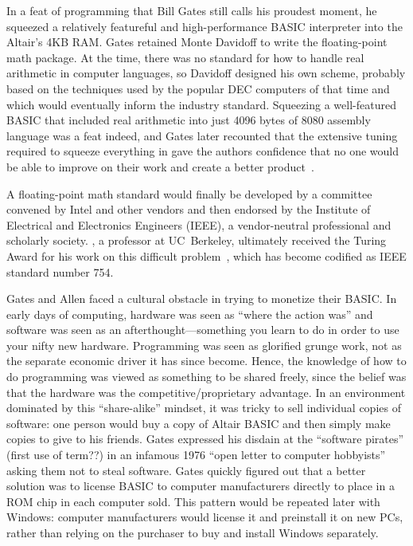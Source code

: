 In a feat of programming that Bill Gates
still calls his proudest moment, he squeezed a relatively featureful
and high-performance BASIC interpreter into the Altair's 4KB RAM.  
Gates retained
Monte Davidoff to write the floating-point math package.
At the time, there was no standard for how to handle real arithmetic in
computer languages, so Davidoff designed his own scheme, probably based
on the techniques used by the popular DEC computers of that time and
which would eventually inform the industry standard.
Squeezing a well-featured BASIC that included real arithmetic into just
4096 bytes of 8080 assembly language was a feat indeed, and Gates later
recounted that the extensive tuning required to squeeze everything in
gave the authors confidence that no one would be able to improve on their
work and create a better product~\cite{programmers_at_work}. 

  \begin{geeknote}
  A floating-point math standard would finally be developed by a
  committee convened by Intel 
  and other vendors and then endorsed by the Institute of Electrical and
  Electronics Engineers (IEEE), a vendor-neutral professional and scholarly
  society.  , a professor at UC~Berkeley, ultimately
  received the 
  Turing Award for his work on this difficult
  problem~\cite{kahan_interview}, which has become codified as IEEE
  standard number 754.
  \end{geeknote}

Gates and Allen faced a cultural obstacle in trying to monetize their
BASIC.  
In early days of computing, hardware was seen as ``where the action
was'' and software was seen as an afterthought---something you learn to
do in order to use your nifty new hardware.
Programming was seen as glorified grunge work, not as the separate
economic driver it has since become.
Hence, the knowledge of how to do programming was viewed as something to be
shared freely, since the belief was that the hardware was the
competitive/proprietary advantage.
In an environment dominated by this
``share-alike'' mindset, it was
tricky to sell individual copies of software: one person would buy a
copy of Altair BASIC and then simply make copies to give to his friends.
Gates
expressed his disdain at the ``software pirates'' (first use of term??)
in an infamous 
1976 ``open letter to computer hobbyists'' asking them not to steal
software.
Gates quickly figured out that a better solution was to license BASIC to
computer manufacturers directly to place in a ROM chip in each computer
sold.  This pattern would be repeated later with Windows: computer
manufacturers would license it and  preinstall it on new PCs,  rather
than relying on the purchaser to buy and install Windows separately.


